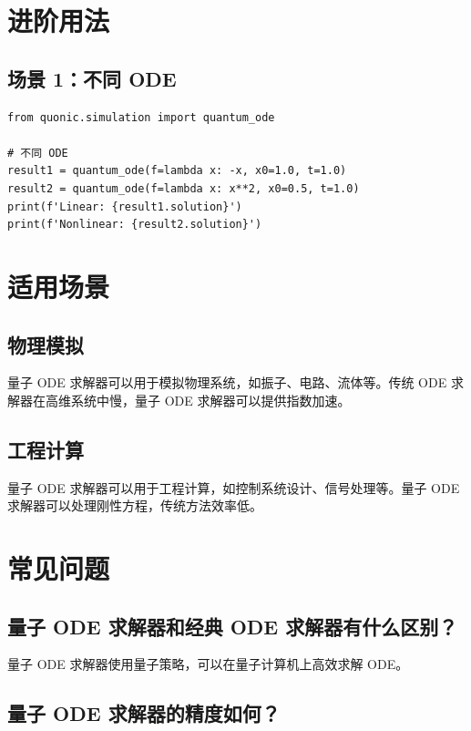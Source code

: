 \documentclass[12pt,a4paper]{article}
\begin{document}
\section{进阶用法}

\subsection{场景 1：不同 ODE}

\begin{verbatim}
from quonic.simulation import quantum_ode

# 不同 ODE
result1 = quantum_ode(f=lambda x: -x, x0=1.0, t=1.0)
result2 = quantum_ode(f=lambda x: x**2, x0=0.5, t=1.0)
print(f'Linear: {result1.solution}')
print(f'Nonlinear: {result2.solution}')
\end{verbatim}

\section{适用场景}

\subsection{物理模拟}

量子 ODE 求解器可以用于模拟物理系统，如振子、电路、流体等。传统 ODE 求解器在高维系统中慢，量子 ODE 求解器可以提供指数加速。

\subsection{工程计算}

量子 ODE 求解器可以用于工程计算，如控制系统设计、信号处理等。量子 ODE 求解器可以处理刚性方程，传统方法效率低。

\section{常见问题}

\subsection{量子 ODE 求解器和经典 ODE 求解器有什么区别？}

量子 ODE 求解器使用量子策略，可以在量子计算机上高效求解 ODE。

\subsection{量子 ODE 求解器的精度如何？}
\end{document}
